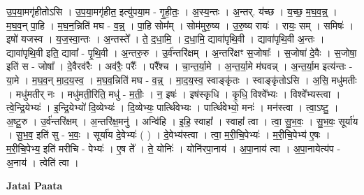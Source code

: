 \documentclass[17pt]{extarticle}
\begin{document}
उ॒प॒या॒मगृ॑हीतोऽसि । उ॒प॒या॒मगृ॑हीत॒ इत्यु॑पया॒म - गृ॒ही॒तः॒ । अ॒स्य॒न्तः । अ॒न्तर्. य॑च्छ । य॒च्छ॒ म॒घ॒व॒न्न्॒ । म॒घ॒व॒न् पा॒हि । म॒घ॒न॒न्निति॑ मघ - व॒न्न्॒ । पा॒हि सोम᳚म् । सोम॑मुरु॒ष्य । उ॒रु॒ष्य रायः॑ । रायः॒ सम् । समिषः॑ । इषो॑ यजस्व । य॒ज॒स्वा॒न्तः । अ॒न्तस्ते᳚ । ते॒ द॒धा॒मि॒ । द॒धा॒मि॒ द्यावा॑पृथि॒वी । द्यावा॑पृथि॒वी अ॒न्तः । द्यावा॑पृथि॒वी इति॒ द्यावा᳚ - पृ॒थि॒वी । अ॒न्तरु॒रु । उ॒र्व॑न्तरि॑क्षम् । अ॒न्तरि॑क्षꣳ स॒जोषाः᳚ । स॒जोषा॑ दे॒वैः । स॒जोषा॒ इति॑ स - जोषा᳚ । दे॒वैरव॑रैः । अव॑रैः॒ परैः᳚ । परै᳚श्च । चा॒न्त॒र्या॒मे । अ॒न्त॒र्या॒मे म॑घवन्न् । अ॒न्त॒र्या॒म इत्य॑न्तः - या॒मे । म॒घ॒व॒न् मा॒द॒य॒स्व॒ । म॒घ॒व॒न्निति॑ मघ - व॒न्न्॒ । मा॒द॒य॒स्व॒ स्वाङ्कृ॑तः । स्वाङ्कृ॑तोऽसि । अ॒सि॒ मधु॑मतीः । मधु॑मतीर् नः । मधु॑मती॒रिति॒ मधु॑ - म॒तीः॒ । न॒ इषः॑ । इष॑स्कृधि । कृ॒धि॒ विश्वे᳚भ्यः । विश्वे᳚भ्यस्त्वा । त्वे॒न्द्रि॒येभ्यः॑ । इ॒न्द्रि॒येभ्यो॑ दि॒व्येभ्यः॑ । दि॒व्येभ्यः॒ पार्त्थि॑वेभ्यः । पार्त्थि॑वेभ्यो॒ मनः॑ । मन॑स्त्वा । त्वा॒ऽष्टु॒ । अ॒ष्टू॒रु । उ॒र्व॑न्तरि॑क्षम् । अ॒न्तरि॑क्ष॒मनु॑ । अन्वि॑हि । इ॒हि॒ स्वाहा᳚ । स्वाहा᳚ त्वा । त्वा॒ सु॒भ॒वः॒ । सु॒भ॒वः॒ सूर्या॑य । सु॒भ॒व॒ इति॑ सु - भ॒वः॒ । सूर्या॑य दे॒वेभ्यः॑ ( ) । दे॒वेभ्य॑स्त्वा । त्वा॒ म॒री॒चि॒पेभ्यः॑ । म॒री॒चि॒पेभ्य॑ ए॒षः । म॒री॒चि॒पेभ्य॒ इति॑ मरीचि - पेभ्यः॑ । ए॒ष ते᳚ । ते॒ योनिः॑ । योनि॑रपा॒नाय॑ । 
अ॒पा॒नाय॑ त्वा । अ॒पा॒नायेत्य॑प - अ॒नाय॑ । त्वेति॑ त्वा । \newline

\textbf{Jatai Paata} \newline
\end{document}
